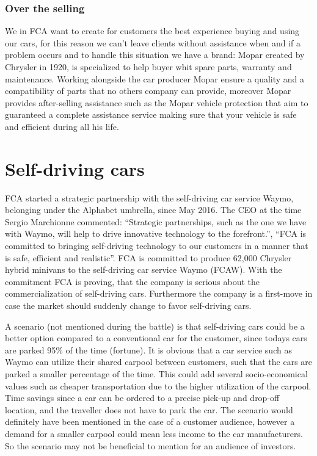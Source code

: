 \subsubsection{Over the selling}
We in FCA want to create for customers the best experience buying and using our cars, for this reason we can't leave clients without assistance when and if a problem occurs and to handle this situation we have a brand: Mopar \cite{Mopar} created by Chrysler in 1920, is specialized to help buyer whit spare parts, warranty and maintenance. Working alongside the car producer Mopar ensure a quality and a compatibility of parts that no others company can provide, moreover Mopar provides after-selling assistance such as the Mopar vehicle protection that aim to guaranteed a complete assistance service making sure that your vehicle is safe and efficient during all his life.


\section{Self-driving cars}

FCA started a strategic partnership with the self-driving car service Waymo, belonging under the Alphabet umbrella, since May 2016. The CEO at the time Sergio Marchionne commented: “Strategic partnerships, such as the one we have with Waymo, will help to drive innovative technology to the forefront.”, “FCA is committed to bringing self-driving technology to our customers in a manner that is safe, efficient and realistic”. FCA is committed to produce 62,000 Chrysler hybrid minivans to the self-driving car service Waymo (FCAW). With the commitment FCA is proving, that the company is serious about the commercialization of self-driving cars. Furthermore the company is a first-move in case the market should suddenly change to favor self-driving cars.

A scenario (not mentioned during the battle) is that self-driving cars could be a better option compared to a conventional car for the customer, since todays cars are parked 95\% of the time (fortune). It is obvious that a car service such as Waymo can utilize their shared carpool between customers, such that the cars are parked a smaller percentage of the time. This could add several socio-economical values such as cheaper transportation due to the higher utilization of the carpool. Time savings since a car can be ordered to a precise pick-up and drop-off location, and the traveller does not have to park the car. The scenario would definitely have been mentioned in the case of a customer audience, however a demand for a smaller carpool could mean less income to the car manufacturers. So the scenario may not be beneficial to mention for an audience of investors.

